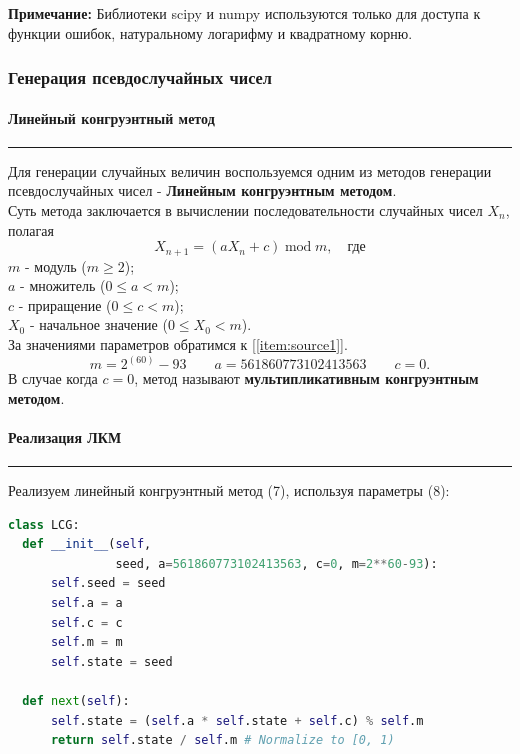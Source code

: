 \documentclass[a4paper, 14pt]{extarticle}
\begin{document}
{\footnotesize \textbf{Примечание:} Библиотеки scipy и numpy используются только 
для доступа к функции ошибок, натуральному логарифму и квадратному корню.}

\subsubsection{Генерация псевдослучайных чисел}

\paragraph{Линейный конгруэнтный метод}\vspace{-20pt}\rule{\linewidth}{0.1mm}

Для генерации случайных величин воспользуемся одним из методов генерации псевдослучайных чисел - 
\textbf{Линейным конгруэнтным методом}.\\
Суть метода заключается в вычислении последовательности случайных чисел $X_n$, полагая
\begin{equation}
  X_{n+1} = (aX_n + c)\hspace{3pt} \text{mod} \hspace{3pt} m, \quad \text{где}
\end{equation}
$m$ - модуль ($m \geq 2$); \\
$a$ - множитель ($0 \leq a < m$); \\
$c$ - приращение ($0 \leq c < m$); \\
$X_0$ - начальное значение ($0 \leq X_0 < m$).\\

За значениями параметров обратимся к [\ref{item:source1}].
\begin{equation}
  m = 2^{(60)} - 93 \qquad a = 561860773102413563 \qquad c = 0.
\end{equation}
В случае когда $c = 0$, метод называют \textbf{мультипликативным конгруэнтным методом}.

\paragraph{Реализация ЛКМ}\vspace{-20pt}\rule{\linewidth}{0.1mm}

Реализуем линейный конгруэнтный метод (7), используя параметры (8):

\begin{center}
  \begin{lstlisting}[language=Python, caption={Реализация ЛКМ}, label={lst:LCG}]
class LCG:
  def __init__(self, 
               seed, a=561860773102413563, c=0, m=2**60-93):
      self.seed = seed
      self.a = a
      self.c = c
      self.m = m
      self.state = seed

  def next(self):
      self.state = (self.a * self.state + self.c) % self.m
      return self.state / self.m # Normalize to [0, 1)
  \end{lstlisting}
\end{center}
\end{document}
